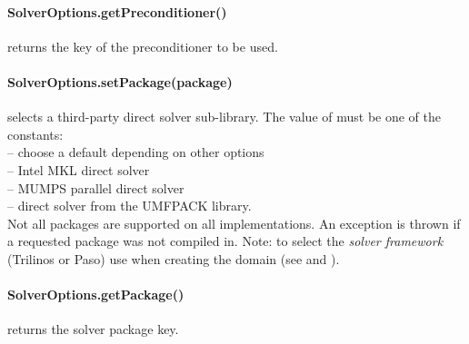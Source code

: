    
\paragraph{SolverOptions.getPreconditioner()}
returns the key of the preconditioner to be used.


\paragraph{SolverOptions.setPackage(package)}
selects a third-party direct solver sub-library.
The value of  must be one of the constants:\\
  -- choose a default depending on other options\\
  -- Intel MKL direct solver\\
  -- MUMPS parallel direct solver\\
  -- direct solver from the UMFPACK library.\\
Not all packages are supported on all implementations.  An exception is thrown
if a requested package was not compiled in.
Note: to select the \emph{solver framework} (Trilinos or Paso) use
 when creating the domain
(see  and ).


\paragraph{SolverOptions.getPackage()}
returns the solver package key.


